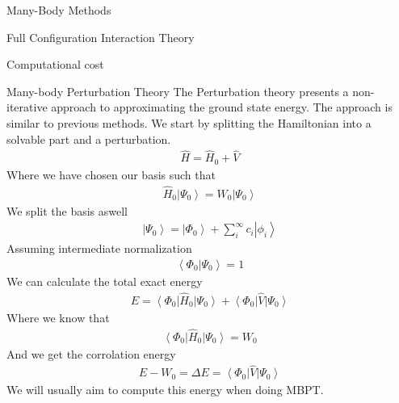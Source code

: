 \documentclass[twoside,english]{uiofysmaster}
\begin{document}
\begin{chapter}{Many-Body Methods}
\begin{section}{Full Configuration Interaction Theory}
\begin{subsection}{Computational cost}
		\end{subsection}

	\end{section}	

	\begin{section}{Many-body Perturbation Theory}
		The Perturbation theory presents a non-iterative approach to approximating the ground state energy. The approach is similar to previous methods. We start by splitting the Hamiltonian into a solvable part and a perturbation. 
	 	\begin{align}
	 		\hat H = \hat H_0 + \hat V
	 	\end{align}
	 	Where we have chosen our basis such that
	 	\begin{align}
	 		\hat H_0 \left| \Psi_0 \right>  = W_0 \left| \Psi_0 \right>
	 	\end{align}
	 	We split the basis aswell
	 	\begin{align}
	 		\left| \Psi_0 \right> = \left| \Phi_0 \right> + \sum_i^{\infty} c_i \left| \phi_i \right>
	 	\end{align}
	 	Assuming intermediate normalization
	 	\begin{align}
	 		\left< \Phi_0 | \Psi_0 \right> = 1
	 	\end{align}
		We can calculate the total exact energy
	 	\begin{align}
	 		E = \left< \Phi_0 \right| \hat H_0 \left| \Psi_0 \right> + \left< \Phi_0 \right| \hat V \left| \Psi_0 \right>
	 	\end{align}
	 	Where we know that
	 	\begin{align}
	 		 \left< \Phi_0 \right| \hat H_0 \left| \Psi_0 \right>  = W_0
	 	\end{align}
	 	And we get the corrolation energy
	 	\begin{align}
	 		E - W_0 = \Delta E = \left< \Phi_0 \right| \hat V \left| \Psi_0 \right>
	 	\end{align}
	 	We will usually aim to compute this energy when doing MBPT. 


\end{section}
\end{chapter}
\end{document}
